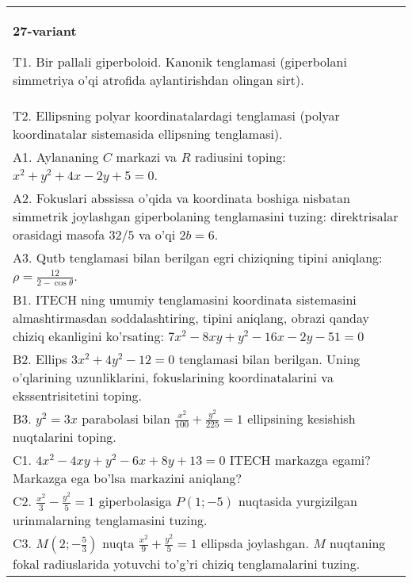 \documentclass{article}
\begin{document}
\begin{tabular}{m{17cm}}
\textbf{27-variant}
\newline

T1. Bir pallali giperboloid. Kanonik tenglamasi (giperbolani simmetriya o'qi atrofida aylantirishdan olingan sirt).\\

T2. Ellipsning polyar koordinatalardagi tenglamasi (polyar koordinatalar sistemasida ellipsning tenglamasi).\\

A1. Aylananing $C$ markazi va $R$ radiusini toping: $x^2+y^2+4x-2y+5=0$.\\

A2. Fokuslari abssissa o'qida va koordinata boshiga nisbatan simmetrik joylashgan giperbolaning tenglamasini tuzing: direktrisalar orasidagi masofa $32/5$ va o'qi $2b=6$.\\

A3. Qutb tenglamasi bilan berilgan egri chiziqning tipini aniqlang: $\rho=\frac{12}{2-\cos\theta}$.\\

B1. ITECH ning umumiy tenglamasini koordinata sistemasini almashtirmasdan soddalashtiring, tipini aniqlang, obrazi qanday chiziq ekanligini ko'rsating: $7x^{2} - 8xy + y^{2} - 16x - 2y - 51 = 0$\\

B2. Ellips $3x^{2} + 4y^{2} - 12 = 0$ tenglamasi bilan berilgan. Uning o'qlarining uzunliklarini, fokuslarining koordinatalarini va ekssentrisitetini toping.  \\

B3. $y^{2} = 3x$ parabolasi bilan $\frac{x^{2}}{100} + \frac{y^{2}}{225} = 1$ ellipsining kesishish nuqtalarini toping.  \\

C1. $4x^{2} - 4xy + y^{2} - 6x + 8y + 13 = 0$ ITECH markazga egami? Markazga ega bo'lsa markazini aniqlang?  \\

C2. $\frac{x^{2}}{3} - \frac{y^{2}}{5} = 1$ giperbolasiga $P(1; - 5)$ nuqtasida yurgizilgan urinmalarning tenglamasini tuzing.\\

C3. $M(2; - \frac{5}{3})$ nuqta $\frac{x^{2}}{9} + \frac{y^{2}}{5} = 1$ ellipsda joylashgan. $M$ nuqtaning fokal radiuslarida yotuvchi to'g'ri chiziq tenglamalarini tuzing.  \\

\end{tabular}
\vspace{1cm}
\end{document}
